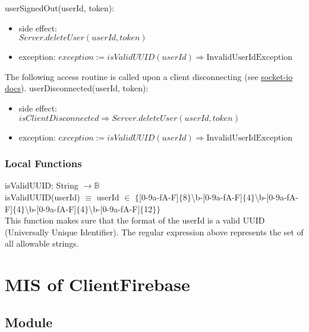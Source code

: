 \documentclass[12pt, titlepage]{article}
\begin{document}
\noindent userSignedOut(userId, token):
\begin{itemize}
\item side effect: \\
$Server.deleteUser(userId, token)$ 

\item exception: $exception := isValidUUID(userId) \Rightarrow \text{InvalidUserIdException}$ 
\end{itemize}

The following access routine is called upon a client disconnecting (see \href{https://socket.io/docs/v4/client-socket-instance/#disconnect}{socket-io docs}). 
\noindent userDisconnected(userId, token):
\begin{itemize}
\item side effect: \\
$isClientDisconnected \Rightarrow Server.deleteUser(userId, token)$ 

\item exception: $exception := isValidUUID(userId) \Rightarrow \text{InvalidUserIdException}$ 
\end{itemize}

\subsubsection{Local Functions}

isValidUUID: String $\rightarrow \mathbb{B}$  \\
isValidUUID(userId) $\equiv$ userId $\in$ $\{$[0-9a-fA-F]$\{$8$\}$\textbackslash b-[0-9a-fA-F]$\{$4$\}$\textbackslash b-[0-9a-fA-F]$\{$4$\}$\textbackslash b-[0-9a-fA-F]$\{$4$\}$\textbackslash b-[0-9a-fA-F]$\{$12$\}$$\}$ \\
This function makes sure that the format of the userId is a valid UUID (Universally Unique Identifier). The regular expression above represents the set of all allowable strings.  \\
  
\medskip
\newpage
\section{MIS of ClientFirebase} \label{ClientFirebase} 

\subsection{Module}
\end{document}
